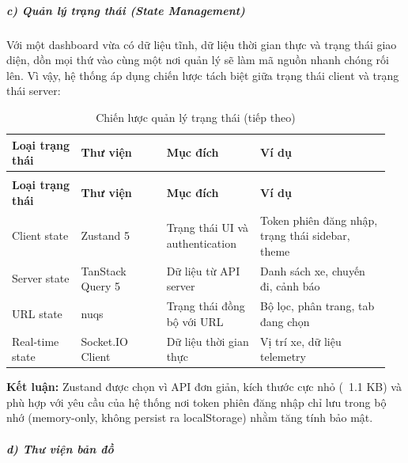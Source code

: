 \documentclass[a4paper]{extarticle}
\newcommand{\thesissettableid}[2]{%
  \renewcommand{\thetable}{#1}%
  \renewcommand{\theHtable}{#2}%
}
\begin{document}
\subparagraph{c) Quản lý trạng thái (State
Management)}\label{c-quux1ea3n-luxfd-trux1ea1ng-thuxe1i-state-management}

Với một dashboard vừa có dữ liệu tĩnh, dữ liệu thời gian thực và trạng
thái giao diện, dồn mọi thứ vào cùng một nơi quản lý sẽ làm mã nguồn
nhanh chóng rối lên. Vì vậy, hệ thống áp dụng chiến lược tách biệt giữa
trạng thái client và trạng thái server:


{\thesissettableid{3.25}{tab-ch3-chien-luoc-quan-ly-trang-thai}
\def\LTcaptype{table}
\begin{longtable}{|L{0.177\linewidth}|L{0.215\linewidth}|L{0.235\linewidth}|L{0.327\linewidth}|}
\caption{Chiến lược quản lý trạng thái}\label{tab:ch3-chien-luoc-quan-ly-trang-thai}\\
\hline \textbf{Loại trạng thái} & \textbf{Thư viện} & \textbf{Mục đích} & \textbf{Ví dụ} \\
\hline
\endfirsthead
\caption[]{Chiến lược quản lý trạng thái (tiếp theo)}\\
\hline \textbf{Loại trạng thái} & \textbf{Thư viện} & \textbf{Mục đích} & \textbf{Ví dụ} \\
\hline
\endhead
\hline
\endfoot
\endlastfoot
Client state & Zustand 5 & Trạng thái UI và authentication & Token phiên
đăng nhập, trạng thái sidebar, theme \\\hline
Server state & TanStack Query 5 & Dữ liệu từ API server & Danh sách xe,
chuyến đi, cảnh báo \\\hline
URL state & nuqs & Trạng thái đồng bộ với URL & Bộ lọc, phân trang, tab
đang chọn \\\hline
Real-time state & Socket.IO Client & Dữ liệu thời gian thực & Vị trí xe,
dữ liệu telemetry \\\hline
\end{longtable}
}


\textbf{Kết luận:} Zustand được chọn vì API đơn giản, kích thước cực nhỏ
(~1.1 KB) và phù hợp với yêu cầu của hệ thống nơi token
phiên đăng nhập chỉ lưu trong bộ nhớ (memory-only, không persist ra
localStorage) nhằm tăng tính bảo mật.

\subparagraph{d) Thư viện bản
đồ}\label{d-thux1b0-viux1ec7n-bux1ea3n-ux111ux1ed3}
\end{document}
